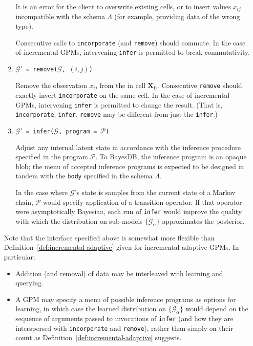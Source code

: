 \documentclass[10pt,letterpaper]{article}
\newcommand{\G}{\mathcal{G}}
\begin{document}
\begin{enumerate}
    It is an error for the client to overwrite existing cells, or to insert values
    $x_{ij}$ incompatible with the schema $\Lambda$ (for example,
    providing data of the wrong type).

    Consecutive calls to \texttt{incorporate} (and \texttt{remove})
    should commute.  In the case of incremental GPMs, intervening
    \texttt{infer} is permitted to break commutativity.

\item \texttt{$\G'$ = remove($\G$, $(i, j)$)}

    Remove the observation $x_{ij}$ from the in cell $\mathbf{X_{ij}}$.
    Consecutive \texttt{remove} should exactly invert
    \texttt{incorporate} on the same cell.  In the case of incremental
    GPMs, intervening \texttt{infer} is permitted to change the
    result.  (That is, \texttt{incorporate}, \texttt{infer}, \texttt{remove}
    may be different from just the \texttt{infer}.)

\item \texttt{$\G'$ = infer($\G$, program = $\mathcal{P}$)}

    Adjust any internal latent state in accordance with the inference
    procedure specified in the program $\mathcal{P}$.  To BayesDB, the
    inference program is an opaque blob; the menu of accepted
    inference programs is expected to be designed in tandem with the
    \texttt{body} specified in the schema $\Lambda$.

    In the case where $\G$'s state is samples from the current state
    of a Markov chain, $\mathcal{P}$ would specify application of a
    transition operator.  If that operator were asymptotically
    Bayesian, each run of \texttt{infer} would improve the quality
    with which the distribution on sub-models $\{\G_\alpha\}$
    approximates the posterior.
\end{enumerate}

Note that the interface specified above is somewhat more flexible than
Definition~\ref{def:incremental-adaptive} given for incremental
adaptive GPMs.  In particular:

\begin{itemize}
\item Addition (and removal) of data may be interleaved with learning
  and querying.
\item A GPM may specify a menu of possible inference programs as
  options for learning, in which case the learned distribution on
  $\{\G_\alpha\}$ would depend on the sequence of arguments passed to invocations
  of \texttt{infer} (and how they are interspersed with
  \texttt{incorporate} and \texttt{remove}), rather than simply on
  their count as Definition~\ref{def:incremental-adaptive} suggests.
\end{itemize}
\end{document}
